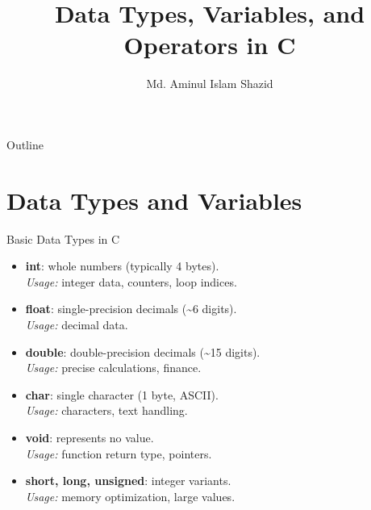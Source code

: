 \documentclass[12pt, aspectratio=169]{beamer}
\title{Data Types, Variables, and Operators in C}
\author{Md. Aminul Islam Shazid}
\date{}
\begin{document}
    {
		\addtocounter{framenumber}{-2}    %

		\begin{frame}
			\titlepage
		\end{frame}

		\begin{frame}{Outline}
            \vfill
			\tableofcontents[subsectionstyle=hide]
            \vfill
		\end{frame}
	}

    \section{Data Types and Variables}

    \begin{frame}{Basic Data Types in C}
        \begin{itemize}
            \item \textbf{int}: whole numbers (typically 4 bytes). \\
                \textit{Usage:} integer data, counters, loop indices.
            \item \textbf{float}: single-precision decimals (\~{}6 digits). \\
                \textit{Usage:} decimal data.
            \item \textbf{double}: double-precision decimals (\~{}15 digits). \\
                \textit{Usage:} precise calculations, finance.
            \item \textbf{char}: single character (1 byte, ASCII). \\
                \textit{Usage:} characters, text handling.
            \item \textbf{void}: represents no value. \\
                \textit{Usage:} function return type, pointers.
            \item \textbf{short, long, unsigned}: integer variants. \\
                \textit{Usage:} memory optimization, large values.
        \end{itemize}
    \end{frame}
\end{document}
